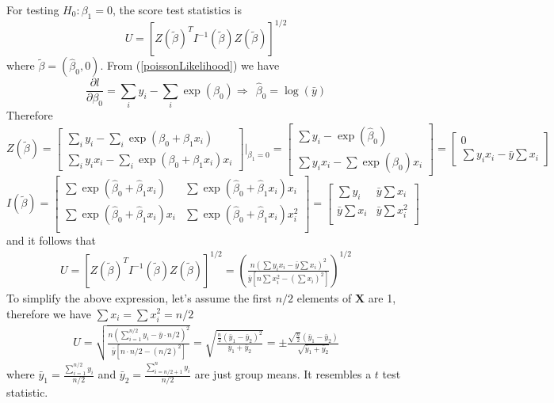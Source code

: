\documentclass[11pt, a4paper]{article}
\begin{document}
\begin{appendix}
    
    For testing $H_0:\beta_1=0$, the score test statistics is 
    \[U = [Z(\tilde{\beta})^T I^{-1}(\tilde{\beta}) Z(\tilde{\beta})]^{1/2} \]
    where $\tilde{\beta} = (\hat{\beta}_0, 0)$.   From (\ref{poissonLikelihood}) we have
    \[\frac{\partial l}{\partial \beta_0} = \sum_i y_i - \sum_i \exp(\beta_0) \Rightarrow ~~ \hat{\beta}_0 = \log (\bar{y})\] 
    Therefore
    \[Z(\tilde{\beta}) = \left[
    \begin{array}{c}
    \sum_i y_i - \sum_i\exp(\beta_0 + \beta_1x_i) \\
    \sum_i y_ix_i -\sum_i \exp(\beta_0 + \beta_1x_i)x_i
    \end{array}
    \right]|_{\beta_1 = 0}
    = \left[
    \begin{array}{c}
    \sum y_i - \exp(\hat{\beta}_0) \\
    \sum y_ix_i - \sum\exp(\hat{\beta}_0)x_i 
    \end{array}
    \right]
    = \left[
    \begin{array}{c}
    0\\
    \sum y_ix_i - \bar{y}\sum x_i 
    \end{array}
    \right]
    \]
    \[I(\tilde{\beta}) = 
    \left[
    \begin{array}{cc}
    \sum \exp (\hat{\beta}_0 + \hat{\beta}_1 x_i)& \sum \exp (\hat{\beta}_0 + \hat{\beta}_1 x_i)x_i\\
    \sum \exp (\hat{\beta}_0 + \hat{\beta}_1 x_i)x_i & \sum \exp (\hat{\beta}_0 + \hat{\beta}_1 x_i)x_i^2  \\
    \end{array}\right]
    =\left[\begin{array}{cc}
    \sum y_i  & \bar{y}\sum x_i \\
    \bar{y}\sum x_i  &\bar{y}\sum x_i^2\\
    \end{array}\right]
    \]
    and it follows that 
    \begin{align}\label{scoretest1}
    U =  [Z(\tilde{\beta})^T I^{-1}(\tilde{\beta}) Z(\tilde{\beta})]^{1/2} =\left( \frac{n(\sum y_ix_i -\bar{y}\sum x_i)^2}{\bar{y}[n\sum x_i^2 -(\sum x_i)^2]}\right)^{1/2}
    \end{align}
    To simplify the above expression, let's assume the first $n/2$ elements of $\bm X$ are 1, therefore we have $\sum x_i =\sum x_i^2=n/2$
    \begin{align}\label{scoretest2}
    U = \sqrt{\frac{n(\sum_{i=1}^{n/2}y_i-\bar{y}\cdot n/2)^2}{\bar{y}[n\cdot n/2 - (n/2)^2]}} = \sqrt{\frac{\frac{n}{2} (\bar{y}_1-\bar{y}_2)^2}{\bar{y}_1 + \bar{y}_2}} = \pm \frac{\sqrt{\frac{n}{2}}(\bar{y}_1- \bar{y}_2)}{\sqrt{\bar{y}_1 + \bar{y}_2}}
    \end{align}
    where $\bar{y}_1 = \frac{\sum_{i=1}^{n/2}y_i }{n/2}$ and $\bar{y}_2 =  \frac{\sum_{i=n/2 +1}^{n}y_i}{n/2}$ are just group means. It resembles a $t$ test statistic.
    

\end{appendix}
\end{document}
